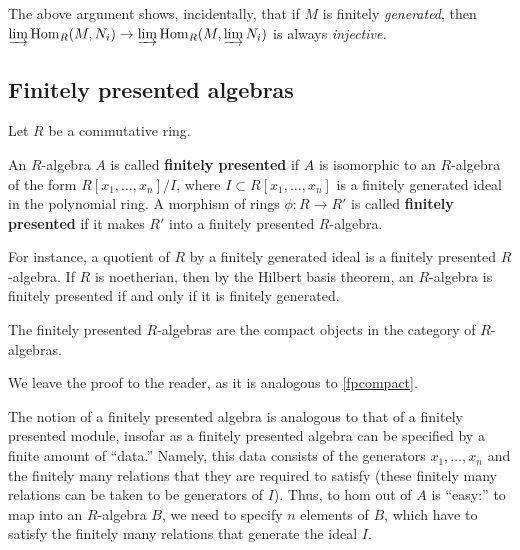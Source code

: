 The above argument shows, incidentally, that if $M$ is finitely
\emph{generated}, then 
$\varinjlim \hom_R(M, N_i) \to \varinjlim \hom_R( M, \varinjlim N_i)  $ is
always \emph{injective.}


\subsection{Finitely presented algebras}

Let $R$ be a commutative ring.
\begin{definition} 
An $R$-algebra $A$ is called \textbf{finitely presented} if $A$ is isomorphic
to an $R$-algebra of the form $R[x_1, \dots, x_n]/I$, where $I \subset R[x_1,
\dots, x_n]$ is a finitely generated ideal in the polynomial ring.
A morphism of rings $\phi: R \to R'$ is called \textbf{finitely presented} if
it makes $R'$ into a finitely presented $R$-algebra.
\end{definition} 

For instance, a quotient of $R$ by a finitely generated ideal is a finitely
presented $R$-algebra. If $R$ is noetherian, then by the Hilbert basis
theorem, an $R$-algebra is finitely presented if and only if it is finitely
generated. 

\begin{proposition} 
The finitely presented $R$-algebras are the compact objects in the category of
$R$-algebras.
\end{proposition} 
We leave the proof to the reader, as it is analogous to \cref{fpcompact}.

The notion of a finitely presented algebra is analogous to that of a finitely
presented module, insofar as a finitely presented algebra can be specified by a
finite amount of ``data.''
Namely, this data consists of the generators $x_1, \dots, x_n$ and the
finitely many relations that they are required to satisfy (these finitely
many relations can be taken to be generators of $I$).
Thus, to hom out of $A$ is ``easy:'' to map into an $R$-algebra $B$, we need
to specify $n$ elements of $B$, which have to satisfy the finitely many
relations that generate the ideal $I$.


